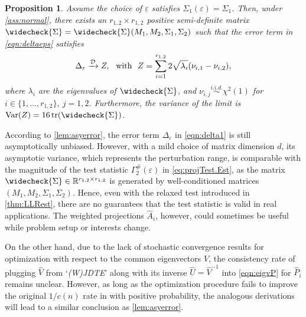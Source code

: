 \documentclass[12pt]{article}
\numberwithin{equation}{section}
\numberwithin{table}{section}
\numberwithin{thm}{section}
\numberwithin{defn}{section}
\numberwithin{lem}{section}
\newtheorem{prop}{Proposition}
\numberwithin{prop}{section}
\numberwithin{cor}{section}
\numberwithin{rem}{section}
\DeclareMathOperator{\tr}{tr}
\DeclareMathOperator{\var}{Var}
\begin{document}
\begin{appendix}
\begin{prop}\label{lem:asyerror} 
Assume the choice of $\varepsilon$ satisfies $\Sigma_1(\varepsilon) = \Sigma_1$. Then, under \autoref{ass:normal}, there exists an $r_{1,2} \times r_{1,2}$ positive semi-definite matrix
$
\widecheck{\Sigma} = \widecheck{\Sigma}(M_1, M_2, \Sigma_1, \Sigma_2)
$
such that the error term in \eqref{eqn:deltaeps} satisfies
$$
\Delta_\varepsilon \xrightarrow{\mathcal{D}} 
Z, \hspace{0.12cm} \text{ with } \hspace{0.12cm} Z= 
\sum_{i = 1}^{r_{1,2}} 2\sqrt{\lambda_i} (\nu_{i,1} - \nu_{i,2}),
$$
where $\lambda_i$ are the eigenvalues of $\widecheck{\Sigma}$, and $\nu_{i,j} \stackrel{i.i.d.}{\sim} \chi^2(1)$ for $i \in  \{1, \dots, r_{1,2}\}, ~ j=1, 2$. Furthermore, the variance of the limit is $\var(Z) = 16 \tr(\widecheck{\Sigma})$.
\end{prop}

According to \autoref{lem:asyerror}, the error term $\Delta_\varepsilon$ in \eqref{eqn:delta1} is still asymptotically unbiased. However, with a mild choice of matrix dimension $d$, its asymptotic variance, which represents the perturbation range, is comparable with the magnitude of the test statistic $\Gamma_2^\#(\varepsilon)$ in \eqref{eq:projTest.Est}, as the matrix $\widecheck{\Sigma} \in \mathbb{R}^{r_{1,2} \times r_{1,2}}$ is generated by well-conditioned matrices $(M_1, M_2, \Sigma_1, \Sigma_2)$. Hence, even with the relaxed test introduced in \autoref{thm:LLRest}, there are no guarantees that the test statistic is valid in real applications. The weighted projections $\widehat{A}_i$, however, could sometimes be useful while problem setup or interests change.

On the other hand, due to the lack of stochastic convergence results for optimization with respect to the common eigenvectors $V$, the consistency rate of plugging $\widehat{V}$ from `\textit{(W)JDTE}' along with its inverse $\widehat{U} = \widehat{V}^{-1}$ into \eqref{eqn:eigvP} for $\widehat{P}_i$ remains unclear. However, as long as the optimization procedure fails to improve the original $1/c(n)$ rate in  with positive probability, the analogous derivations will lead to a similar conclusion as \autoref{lem:asyerror}.



\end{appendix}
\end{document}
